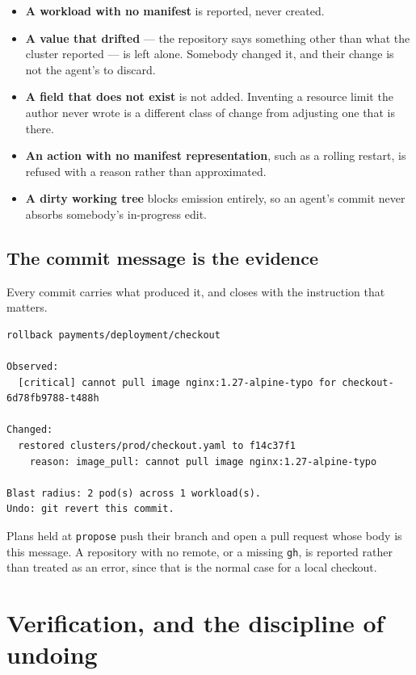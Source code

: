 \documentclass[11pt,a4paper]{article}
\newcommand{\code}[1]{\texttt{\small #1}}
\begin{document}
\begin{itemize}
  \item \textbf{A workload with no manifest} is reported, never created.
  \item \textbf{A value that drifted} --- the repository says something other than what the cluster reported --- is left alone. Somebody changed it, and their change is not the agent's to discard.
  \item \textbf{A field that does not exist} is not added. Inventing a resource limit the author never wrote is a different class of change from adjusting one that is there.
  \item \textbf{An action with no manifest representation}, such as a rolling restart, is refused with a reason rather than approximated.
  \item \textbf{A dirty working tree} blocks emission entirely, so an agent's commit never absorbs somebody's in-progress edit.
\end{itemize}

\subsection{The commit message is the evidence}

Every commit carries what produced it, and closes with the instruction that
matters.

\begin{lstlisting}[caption={A generated commit message, verbatim from the live demo.}]
rollback payments/deployment/checkout

Observed:
  [critical] cannot pull image nginx:1.27-alpine-typo for checkout-6d78fb9788-t488h

Changed:
  restored clusters/prod/checkout.yaml to f14c37f1
    reason: image_pull: cannot pull image nginx:1.27-alpine-typo

Blast radius: 2 pod(s) across 1 workload(s).
Undo: git revert this commit.
\end{lstlisting}

Plans held at \code{propose} push their branch and open a pull request whose body
is this message. A repository with no remote, or a missing \code{gh}, is reported
rather than treated as an error, since that is the normal case for a local
checkout.

\section{Verification, and the discipline of undoing}
\end{document}
